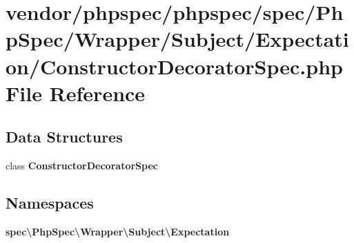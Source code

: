 \section{vendor/phpspec/phpspec/spec/\+Php\+Spec/\+Wrapper/\+Subject/\+Expectation/\+Constructor\+Decorator\+Spec.php File Reference}
\label{_constructor_decorator_spec_8php}
\subsection*{Data Structures}
\begin{DoxyCompactItemize}
\item 
class {\bf Constructor\+Decorator\+Spec}
\end{DoxyCompactItemize}
\subsection*{Namespaces}
\begin{DoxyCompactItemize}
\item 
 {\bf spec\textbackslash{}\+Php\+Spec\textbackslash{}\+Wrapper\textbackslash{}\+Subject\textbackslash{}\+Expectation}
\end{DoxyCompactItemize}
